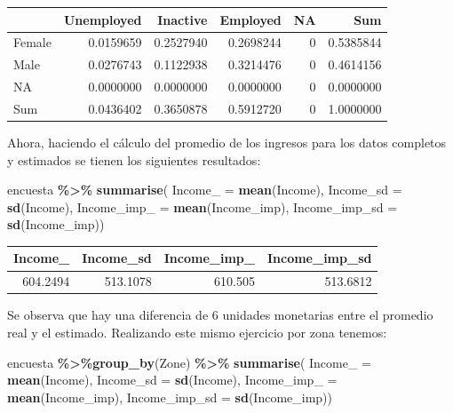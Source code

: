 \documentclass[
  12pt,
]{book}
\newenvironment{Shaded}{\begin{snugshade}}{\end{snugshade}}
\newcommand{\AttributeTok}[1]{\textcolor[rgb]{0.13,0.29,0.53}{#1}}
\newcommand{\FunctionTok}[1]{\textcolor[rgb]{0.13,0.29,0.53}{\textbf{#1}}}
\newcommand{\NormalTok}[1]{#1}
\newcommand{\SpecialCharTok}[1]{\textcolor[rgb]{0.81,0.36,0.00}{\textbf{#1}}}
\begin{document}
\begin{tabular}{l|r|r|r|r|r}
\hline
  & Unemployed & Inactive & Employed & NA & Sum\\
\hline
Female & 0.0159659 & 0.2527940 & 0.2698244 & 0 & 0.5385844\\
\hline
Male & 0.0276743 & 0.1122938 & 0.3214476 & 0 & 0.4614156\\
\hline
NA & 0.0000000 & 0.0000000 & 0.0000000 & 0 & 0.0000000\\
\hline
Sum & 0.0436402 & 0.3650878 & 0.5912720 & 0 & 1.0000000\\
\hline
\end{tabular}

Ahora, haciendo el cálculo del promedio de los ingresos para los datos completos y estimados se tienen los siguientes resultados:

\begin{Shaded}
\begin{Highlighting}[]
\NormalTok{encuesta }\SpecialCharTok{\%\textgreater{}\%} \FunctionTok{summarise}\NormalTok{(}
  \AttributeTok{Income\_ =} \FunctionTok{mean}\NormalTok{(Income),}
  \AttributeTok{Income\_sd =} \FunctionTok{sd}\NormalTok{(Income),}
  \AttributeTok{Income\_imp\_ =} \FunctionTok{mean}\NormalTok{(Income\_imp),}
  \AttributeTok{Income\_imp\_sd =} \FunctionTok{sd}\NormalTok{(Income\_imp))}
\end{Highlighting}
\end{Shaded}

\begin{tabular}{r|r|r|r}
\hline
Income\_ & Income\_sd & Income\_imp\_ & Income\_imp\_sd\\
\hline
604.2494 & 513.1078 & 610.505 & 513.6812\\
\hline
\end{tabular}

Se observa que hay una diferencia de 6 unidades monetarias entre el promedio real y el estimado. Realizando este mismo ejercicio por zona tenemos:

\begin{Shaded}
\begin{Highlighting}[]
\NormalTok{encuesta }\SpecialCharTok{\%\textgreater{}\%}\FunctionTok{group\_by}\NormalTok{(Zone) }\SpecialCharTok{\%\textgreater{}\%}  \FunctionTok{summarise}\NormalTok{(}
  \AttributeTok{Income\_ =} \FunctionTok{mean}\NormalTok{(Income),}
  \AttributeTok{Income\_sd =} \FunctionTok{sd}\NormalTok{(Income),}
  \AttributeTok{Income\_imp\_ =} \FunctionTok{mean}\NormalTok{(Income\_imp),}
  \AttributeTok{Income\_imp\_sd =} \FunctionTok{sd}\NormalTok{(Income\_imp))}
\end{Highlighting}
\end{Shaded}
\end{document}
